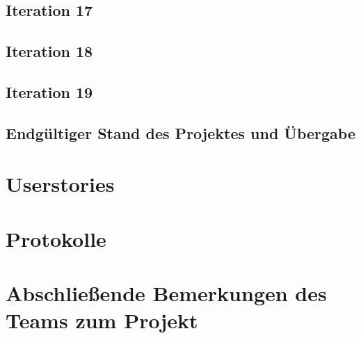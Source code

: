 \documentclass[accentcolor=tud0b,12pt,paper=a4]{tudreport}
\begin{document}
\section*{Iteration 17}

\section*{Iteration 18}

\section*{Iteration 19}

\section*{Endgültiger Stand des Projektes und Übergabe}


\chapter{Userstories}


\chapter{Protokolle}

















\chapter{Abschließende Bemerkungen des Teams zum Projekt}
\end{document}
